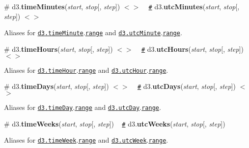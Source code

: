 \label{_timeMinutes}%
\# d3.{\bfseries time\+Minutes}({\itshape start}, {\itshape stop}\mbox{[}, {\itshape step}\mbox{]}) \href{https://github.com/d3/d3-time/blob/master/src/minute.js#L15}{\tt $<$$>$} ~\newline
\href{#timeMinutes}{\tt \#} d3.{\bfseries utc\+Minutes}({\itshape start}, {\itshape stop}\mbox{[}, {\itshape step}\mbox{]}) \href{https://github.com/d3/d3-time/blob/master/src/utcMinute.js#L15}{\tt $<$$>$}

Aliases for \href{#timeMinute}{\tt d3.\+time\+Minute}.\href{#interval_range}{\tt range} and \href{#timeMinute}{\tt d3.\+utc\+Minute}.\href{#interval_range}{\tt range}.

\label{_timeHours}%
\# d3.{\bfseries time\+Hours}({\itshape start}, {\itshape stop}\mbox{[}, {\itshape step}\mbox{]}) \href{https://github.com/d3/d3-time/blob/master/src/hour.js#L17}{\tt $<$$>$} ~\newline
\href{#timeHours}{\tt \#} d3.{\bfseries utc\+Hours}({\itshape start}, {\itshape stop}\mbox{[}, {\itshape step}\mbox{]}) \href{https://github.com/d3/d3-time/blob/master/src/utcHour.js#L15}{\tt $<$$>$}

Aliases for \href{#timeHour}{\tt d3.\+time\+Hour}.\href{#interval_range}{\tt range} and \href{#timeHour}{\tt d3.\+utc\+Hour}.\href{#interval_range}{\tt range}.

\label{_timeDays}%
\# d3.{\bfseries time\+Days}({\itshape start}, {\itshape stop}\mbox{[}, {\itshape step}\mbox{]}) \href{https://github.com/d3/d3-time/blob/master/src/day.js#L15}{\tt $<$$>$} ~\newline
\href{#timeDays}{\tt \#} d3.{\bfseries utc\+Days}({\itshape start}, {\itshape stop}\mbox{[}, {\itshape step}\mbox{]}) \href{https://github.com/d3/d3-time/blob/master/src/utcDay.js#L15}{\tt $<$$>$}

Aliases for \href{#timeDay}{\tt d3.\+time\+Day}.\href{#interval_range}{\tt range} and \href{#timeDay}{\tt d3.\+utc\+Day}.\href{#interval_range}{\tt range}.

\label{_timeWeeks}%
\# d3.{\bfseries time\+Weeks}({\itshape start}, {\itshape stop}\mbox{[}, {\itshape step}\mbox{]}) ~\newline
\href{#timeWeeks}{\tt \#} d3.{\bfseries utc\+Weeks}({\itshape start}, {\itshape stop}\mbox{[}, {\itshape step}\mbox{]})

Aliases for \href{#timeWeek}{\tt d3.\+time\+Week}.\href{#interval_range}{\tt range} and \href{#timeWeek}{\tt d3.\+utc\+Week}.\href{#interval_range}{\tt range}.


